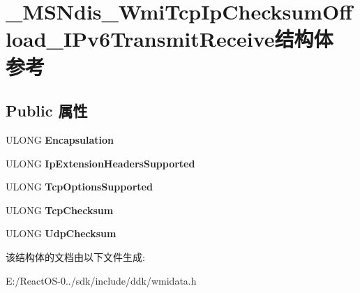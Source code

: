\hypertarget{struct___m_s_ndis___wmi_tcp_ip_checksum_offload___i_pv6_transmit_receive}{}\section{\+\_\+\+M\+S\+Ndis\+\_\+\+Wmi\+Tcp\+Ip\+Checksum\+Offload\+\_\+\+I\+Pv6\+Transmit\+Receive结构体 参考}
\label{struct___m_s_ndis___wmi_tcp_ip_checksum_offload___i_pv6_transmit_receive}
\subsection*{Public 属性}
\begin{DoxyCompactItemize}
\item 
\mbox{\label{struct___m_s_ndis___wmi_tcp_ip_checksum_offload___i_pv6_transmit_receive_af5a776eb507e844d8b0e96572cbcad54}} 
U\+L\+O\+NG {\bfseries Encapsulation}
\item 
\mbox{\label{struct___m_s_ndis___wmi_tcp_ip_checksum_offload___i_pv6_transmit_receive_aeb15e2f3d5935b42fd23c44f9cea5980}} 
U\+L\+O\+NG {\bfseries Ip\+Extension\+Headers\+Supported}
\item 
\mbox{\label{struct___m_s_ndis___wmi_tcp_ip_checksum_offload___i_pv6_transmit_receive_a07671a561d49441ab0ed3abd9345ae2a}} 
U\+L\+O\+NG {\bfseries Tcp\+Options\+Supported}
\item 
\mbox{\label{struct___m_s_ndis___wmi_tcp_ip_checksum_offload___i_pv6_transmit_receive_a5fca22ba047fb520ac7e88292f1dde38}} 
U\+L\+O\+NG {\bfseries Tcp\+Checksum}
\item 
\mbox{\label{struct___m_s_ndis___wmi_tcp_ip_checksum_offload___i_pv6_transmit_receive_abfa6a32aabfcbcce086d4b71e943480f}} 
U\+L\+O\+NG {\bfseries Udp\+Checksum}
\end{DoxyCompactItemize}


该结构体的文档由以下文件生成\+:\begin{DoxyCompactItemize}
\item 
E\+:/\+React\+O\+S-\/0../sdk/include/ddk/wmidata.\+h\end{DoxyCompactItemize}
